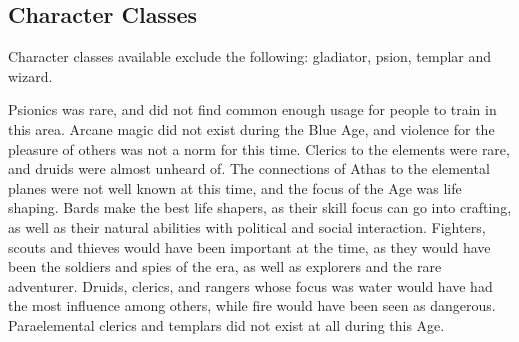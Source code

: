 \subsection{Character Classes}
Character classes available exclude the following: gladiator, psion, templar and wizard.

Psionics was rare, and did not find common enough usage for people to train in this area. Arcane magic did not exist during the Blue Age, and violence for the pleasure of others was not a norm for this time. Clerics to the elements were rare, and druids were almost unheard of. The connections of Athas to the elemental planes were not well known at this time, and the focus of the Age was life shaping. Bards make the best life shapers, as their skill focus can go into crafting, as well as their natural abilities with political and social interaction. Fighters, scouts and thieves would have been important at the time, as they would have been the soldiers and spies of the era, as well as explorers and the rare adventurer. Druids, clerics, and rangers whose focus was water would have had the most influence among others, while fire would have been seen as dangerous. Paraelemental clerics and templars did not exist at all during this Age.
